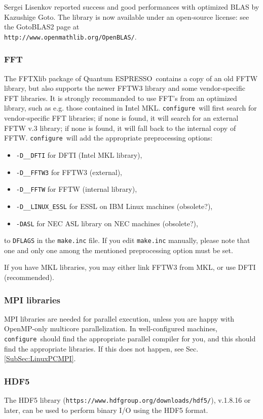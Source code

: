 \documentclass[12pt,a4paper]{article}
\def\qe{{\sc Quantum ESPRESSO}}
\def\configure{\texttt{configure}}
\begin{document}
Sergei Lisenkov reported success and good performances with optimized
BLAS by Kazushige Goto. The library is now available under an
open-source license: see the GotoBLAS2 page at \\
\texttt{http://www.openmathlib.org/OpenBLAS/}.


\subsubsection{FFT}
The FFTXlib package of \qe\ contains a copy of an old FFTW library,
but also supports the newer FFTW3 library and some vendor-specific 
FFT libraries. It is strongly recommanded to use FFT's from an
optimized library, such as e.g. those contained in Intel MKL.
\configure\ will first search for vendor-specific FFT libraries;
if none is found, it will search for an external FFTW v.3 library;
if none is found, it will fall back to the internal  copy of FFTW.
\configure\ will add the appropriate preprocessing options:
\begin{itemize}
\item \texttt{-D\_\_DFTI}  for DFTI (Intel MKL library),
\item \texttt{-D\_\_FFTW3} for FFTW3 (external),
\item \texttt{-D\_\_FFTW}  for FFTW (internal library),
\item \texttt{-D\_\_LINUX\_ESSL} for ESSL on IBM Linux machines (obsolete?),
\item \texttt{-DASL} for NEC ASL library on NEC machines (obsolete?),
\end{itemize}
to \texttt{DFLAGS} in the \texttt{make.inc} file.
If you edit \texttt{make.inc} manually, please note that one and
only one among the mentioned preprocessing option must be set.

If you have MKL libraries, you may either link FFTW3 from MKL,
or use DFTI (recommended).


\subsubsection{MPI libraries}
MPI libraries are needed for parallel execution, unless you are
happy with OpenMP-only multicore parallelization.
In well-configured machines, \configure\ should find the appropriate
parallel compiler for you, and this should find the appropriate
libraries. If this does not happen, see Sec.\ref{SubSec:LinuxPCMPI}.


\subsubsection{HDF5}
The HDF5 library (\texttt{https://www.hdfgroup.org/downloads/hdf5/}),
v.1.8.16 or later, can be used to perform binary I/O using the HDF5
format.
\end{document}
